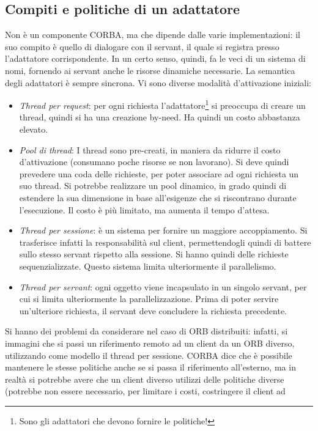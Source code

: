 \subsection{Compiti e politiche di un adattatore}
Non è un componente CORBA, ma che dipende dalle varie implementazioni: il suo compito è quello di dialogare con il
servant, il quale si registra presso l'adattatore corrispondente. In un certo senso, quindi, fa le veci di un sistema
di nomi, fornendo ai servant anche le risorse dinamiche necessarie.
La semantica degli adattatori è sempre sincrona. Vi sono diverse modalità d'attivazione iniziali:
\begin{itemize}
 \item \textit{Thread per request}: per ogni richiesta l'adattatore\footnote{Sono gli adattatori che devono fornire le
 politiche!} si preoccupa di creare un thread, quindi  si ha una creazione by-need. Ha quindi un costo abbastanza
 elevato.
 \item \textit{Pool di thread}: I thread sono pre-creati, in maniera da ridurre il costo d'attivazione (consumano poche
 risorse se non lavorano). Si deve quindi prevedere una coda delle richieste, per poter associare ad ogni richiesta un
 suo thread. Si potrebbe realizzare un pool dinamico, in grado quindi di estendere la sua dimensione in base
 all'esigenze che si riscontrano durante l'esecuzione. Il costo è più limitato, ma aumenta il tempo d'attesa.
 \item \textit{Thread per sessione}: è un sistema per fornire un maggiore accoppiamento. Si trasferisce infatti la
 responsabilità sul client, permettendogli quindi di battere sullo stesso servant rispetto alla sessione. Si hanno
 quindi delle richieste sequenzializzate. Questo sistema limita ulteriormente il parallelismo.
 \item \textit{Thread per servant}: ogni oggetto viene incapsulato in un singolo servant, per cui si limita
 ulteriormente la parallelizzazione. Prima di poter servire un'ulteriore richiesta, il servant deve concludere la
 richiesta precedente.
\end{itemize}
Si hanno dei problemi da considerare nel caso di ORB distribuiti: infatti, si immagini che si passi un riferimento
remoto ad un client da un ORB diverso, utilizzando come modello il thread per sessione. CORBA dice che è possibile
mantenere le stesse politiche anche se si passa il riferimento all'esterno, ma in realtà si potrebbe avere che un client
diverso utilizzi delle politiche diverse (potrebbe non essere necessario, per limitare i costi, costringere il client ad
